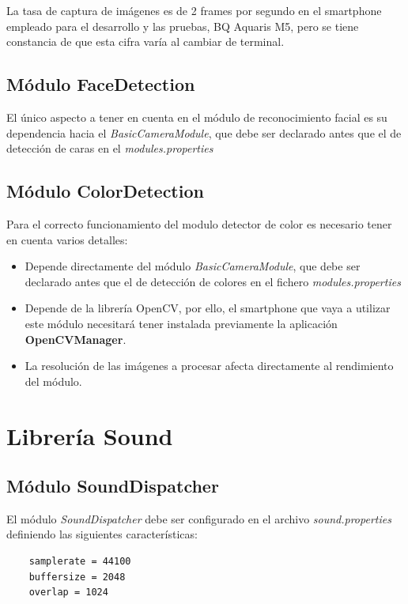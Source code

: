 La tasa de captura de imágenes es de 2 frames por segundo en el smartphone empleado para el desarrollo y las pruebas, BQ Aquaris M5, pero se tiene constancia de que esta cifra varía al cambiar de terminal.
	
\subsection{Módulo FaceDetection}
\label{manual:facedetection}

El único aspecto a tener en cuenta en el módulo de reconocimiento facial es su dependencia hacia el \textit{BasicCameraModule}, que debe ser declarado antes que el de detección de caras en el \textit{modules.properties}

\subsection{Módulo ColorDetection}
\label{manual:colordetection}

Para el correcto funcionamiento del modulo detector de color es necesario tener en cuenta varios detalles:
\begin{itemize}
	\item Depende directamente del módulo \textit{BasicCameraModule}, que debe ser declarado antes que el de detección de colores en el fichero \textit{modules.properties}
	\item Depende de la librería OpenCV, por ello, el smartphone que vaya a utilizar este módulo necesitará tener instalada previamente la aplicación \textbf{OpenCVManager}.
	\item La resolución de las imágenes a procesar afecta directamente al rendimiento del módulo.
\end{itemize}

\section{Librería Sound}

\subsection{Módulo SoundDispatcher}
\label{manual:sounddispatcher}

El módulo \textit{SoundDispatcher} debe ser configurado en el archivo \textit{sound.properties} definiendo las siguientes características:
\begin{verbatim}
	samplerate = 44100
	buffersize = 2048
	overlap = 1024
\end{verbatim}

